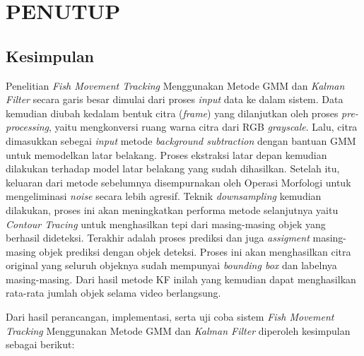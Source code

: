 
\chapter{PENUTUP}

	\section{Kesimpulan}
		Penelitian \textit{Fish Movement Tracking} Menggunakan Metode GMM dan \textit{Kalman Filter} secara garis besar dimulai dari proses \textit{input} data ke dalam sistem. Data kemudian diubah kedalam bentuk citra (\textit{frame}) yang dilanjutkan oleh proses \textit{pre-processing}, yaitu mengkonversi ruang warna citra dari RGB \textit{grayscale}. Lalu, citra dimasukkan sebegai \textit{input} metode \textit{background subtraction} dengan bantuan GMM untuk memodelkan latar belakang. Proses ekstraksi latar depan kemudian dilakukan terhadap model latar belakang yang sudah dihasilkan. Setelah itu, keluaran dari metode sebelumnya disempurnakan oleh Operasi Morfologi untuk mengeliminasi \textit{noise} secara lebih agresif. Teknik \textit{downsampling} kemudian dilakukan, proses ini akan meningkatkan performa metode selanjutnya yaitu \textit{Contour Tracing} untuk menghasilkan tepi dari masing-masing objek yang berhasil dideteksi. Terakhir adalah proses prediksi dan juga \textit{assigment} masing-masing objek prediksi dengan objek deteksi. Proses ini akan menghasilkan citra original yang seluruh objeknya sudah mempunyai \textit{bounding box} dan labelnya masing-masing. Dari hasil metode KF inilah yang kemudian dapat menghasilkan rata-rata jumlah objek selama video berlangsung.
		
		Dari hasil perancangan, implementasi, serta uji coba sistem \textit{Fish Movement Tracking} Menggunakan Metode GMM dan \textit{Kalman Filter} diperoleh kesimpulan sebagai berikut:

